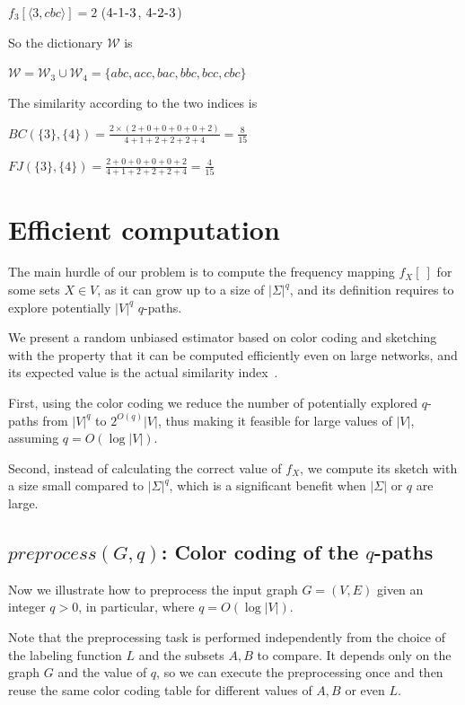 $f_{3}[\langle 3, cbc \rangle] = 2$ ($\textsc{4-1-3}$, $\textsc{4-2-3}$)\bigskip
		
So the dictionary $\mathcal{W}$ is \medskip
		
$\mathcal{W} = \mathcal{W}_3 \cup \mathcal{W}_4 = \{ abc, acc, bac, bbc, bcc, cbc \}$\bigskip
		
The similarity according to the two indices is \medskip

$BC(\{3\}, \{4\}) = \frac{2 \times ( 2 + 0 + 0 + 0 + 0 + 2 ) }{ 4 + 1 + 2 + 2 + 2 + 4 } = \frac{8}{15}$ \medskip
		
$FJ(\{3\}, \{4\}) = \frac{ 2 + 0 + 0 + 0 + 0 + 2 }{ 4 + 1 + 2 + 2 + 2 + 4 } = \frac{4}{15}$ \medskip
		
\clearpage

\section{Efficient computation}

The main hurdle of our problem is to compute the frequency mapping $f_{X}[\ ]$ for some sets $X \in V$, as it can grow up to a size of $|\Sigma|^{q}$, and its definition requires to explore potentially $|V|^{q}$ $q$-paths.\medskip

We present a random unbiased estimator based on color coding and sketching with the property that it can be computed efficiently even on large networks, and its expected value is the actual similarity index~\cite{SubSim}.\medskip

First, using the color coding we reduce the number of potentially explored $q$-paths from $|V|^{q}$ to $2^{O(q)}|V|$, thus making it feasible for large values of $|V|$, assuming $q = O(\log |V|)$.

Second, instead of calculating the correct value of $f_{X}$, we compute its sketch with a size small compared to $|\Sigma|^{q}$, which is a significant benefit when $|\Sigma|$ or $q$ are large.

\subsection*{$preprocess(G,q)$: Color coding of the $q$-paths}

Now we illustrate how to preprocess the input graph $G=(V,E)$ given an integer $q > 0$, in particular, where $q = O(\log |V|)$.

Note that the preprocessing task is performed independently from the choice of the labeling function $L$ and the subsets $A,B$ to compare. It depends only on the graph $G$ and the value of $q$, so we can execute the preprocessing once and then reuse the same color coding table for different values of $A,B$ or even $L$.\medskip

